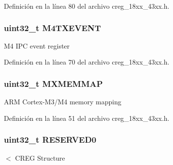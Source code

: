Definición en la línea 80 del archivo creg\+\_\+18xx\+\_\+43xx.\+h.

\subsubsection[{\texorpdfstring{M4\+T\+X\+E\+V\+E\+NT}{M4TXEVENT}}]{ uint32\+\_\+t M4\+T\+X\+E\+V\+E\+NT}\hypertarget{struct_l_p_c___c_r_e_g___t_a42189a13c97519d629dfc78e415da65a}{}\label{struct_l_p_c___c_r_e_g___t_a42189a13c97519d629dfc78e415da65a}
M4 I\+PC event register 

Definición en la línea 70 del archivo creg\+\_\+18xx\+\_\+43xx.\+h.

\subsubsection[{\texorpdfstring{M\+X\+M\+E\+M\+M\+AP}{MXMEMMAP}}]{ uint32\+\_\+t M\+X\+M\+E\+M\+M\+AP}\hypertarget{struct_l_p_c___c_r_e_g___t_af024029ef87447fa486fb7143f2a3821}{}\label{struct_l_p_c___c_r_e_g___t_af024029ef87447fa486fb7143f2a3821}
A\+RM Cortex-\/\+M3/\+M4 memory mapping 

Definición en la línea 51 del archivo creg\+\_\+18xx\+\_\+43xx.\+h.

\subsubsection[{\texorpdfstring{R\+E\+S\+E\+R\+V\+E\+D0}{RESERVED0}}]{ uint32\+\_\+t R\+E\+S\+E\+R\+V\+E\+D0}\hypertarget{struct_l_p_c___c_r_e_g___t_ad06839c5382047f4f9f2c74cc61db942}{}\label{struct_l_p_c___c_r_e_g___t_ad06839c5382047f4f9f2c74cc61db942}
$<$ C\+R\+EG Structure 

